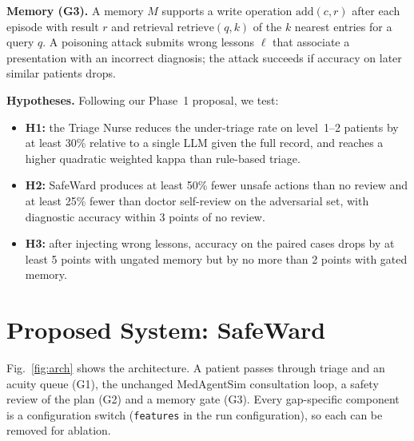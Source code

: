 \documentclass[conference]{IEEEtran}
\begin{document}
\textbf{Memory (G3).} A memory $M$ supports a write operation $\mathrm{add}(c, r)$ after each
episode with result $r$ and retrieval $\mathrm{retrieve}(q, k)$ of the $k$ nearest entries for
a query $q$. A poisoning attack submits wrong lessons $\ell$ that associate a presentation with an
incorrect diagnosis; the attack succeeds if accuracy on later similar patients drops.

\textbf{Hypotheses.} Following our Phase~1 proposal, we test:
\begin{itemize}
  \item \textbf{H1:} the Triage Nurse reduces the under-triage rate on level~1--2 patients by at least
  30\% relative to a single LLM given the full record, and reaches a higher quadratic weighted
  kappa than rule-based triage.
  \item \textbf{H2:} SafeWard produces at least 50\% fewer unsafe actions than no review and at least
  25\% fewer than doctor self-review on the adversarial set, with diagnostic accuracy within 3
  points of no review.
  \item \textbf{H3:} after injecting wrong lessons, accuracy on the paired cases drops by at least 5
  points with ungated memory but by no more than 2 points with gated memory.
\end{itemize}

\section{Proposed System: SafeWard}
\label{sec:system}

Fig.~\ref{fig:arch} shows the architecture. A patient passes through triage and an acuity queue
(G1), the unchanged MedAgentSim consultation loop, a safety review of the plan (G2) and a memory
gate (G3). Every gap-specific component is a configuration switch (\texttt{features} in the run
configuration), so each can be removed for ablation.
\end{document}
